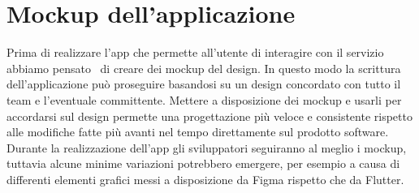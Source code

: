 \section{Mockup dell'applicazione}
Prima di realizzare l'app che permette all'utente di interagire con il servizio abbiamo pensato \ di creare dei mockup del design.
In questo modo la scrittura dell'applicazione può proseguire basandosi su un design concordato con tutto il team e l'eventuale committente.
Mettere a disposizione dei mockup e usarli per accordarsi sul design permette una progettazione più veloce e consistente rispetto alle modifiche fatte
più avanti nel tempo direttamente sul prodotto software.
Durante la realizzazione dell'app gli sviluppatori seguiranno al meglio i mockup, tuttavia alcune minime variazioni potrebbero emergere, per esempio a causa
di differenti elementi grafici messi a disposizione da Figma rispetto che da Flutter.

